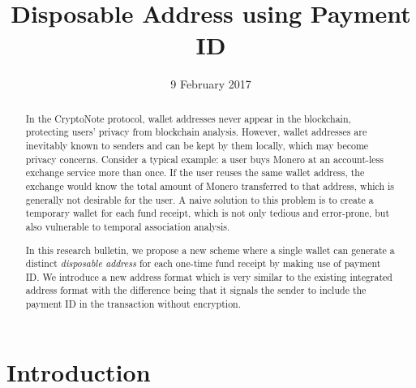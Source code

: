 \documentclass[12pt,english]{mrl}
\theoremstyle{definition}
\numberwithin{equation}{section}
\numberwithin{figure}{section}
\numberwithin{equation}{section}
\numberwithin{equation}{section}
\numberwithin{figure}{section}
\begin{document}
\begin{frontmatter}

\begin{fmbox}
\hfill\setlength{\fboxrule}{0px}\setlength{\fboxsep}{5px}
\title{Disposable Address using Payment ID}
\date{9 February 2017}
\author[]{}
\author[
   addressref={mrl},
   email={lab@getmonero.org}
]{}


\address[id=mrl]{
}
\end{fmbox}


\begin{abstractbox}
\begin{abstract}

In the CryptoNote protocol, wallet addresses never appear in the blockchain, protecting users' privacy from blockchain analysis. However, wallet addresses are inevitably known to senders and can be kept by them locally, which may become privacy concerns. Consider a typical example: a user buys Monero at an account-less exchange service more than once. If the user reuses the same wallet address, the exchange would know the total amount of Monero transferred to that address, which is generally not desirable for the user. A naive solution to this problem is to create a temporary wallet for each fund receipt, which is not only tedious and error-prone, but also vulnerable to temporal association analysis.

In this research bulletin, we propose a new scheme where a single wallet can generate a distinct \emph{disposable address} for each one-time fund receipt by making use of payment ID. We introduce a new address format which is very similar to the existing integrated address format with the difference being that it signals the sender to include the payment ID in the transaction without encryption.

\end{abstract}
\end{abstractbox}

\end{frontmatter}


\section{Introduction}\label{introduction}
\end{document}
